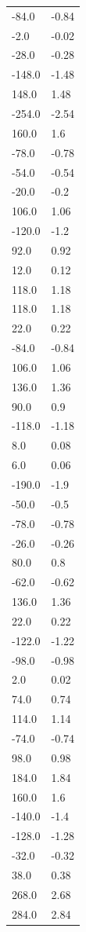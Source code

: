 \begin{longtable}{ll}
-84.0 & -0.84 \\
-2.0 & -0.02 \\
-28.0 & -0.28 \\
-148.0 & -1.48 \\
148.0 & 1.48 \\
-254.0 & -2.54 \\
160.0 & 1.6 \\
-78.0 & -0.78 \\
-54.0 & -0.54 \\
-20.0 & -0.2 \\
106.0 & 1.06 \\
-120.0 & -1.2 \\
92.0 & 0.92 \\
12.0 & 0.12 \\
118.0 & 1.18 \\
118.0 & 1.18 \\
22.0 & 0.22 \\
-84.0 & -0.84 \\
106.0 & 1.06 \\
136.0 & 1.36 \\
90.0 & 0.9 \\
-118.0 & -1.18 \\
8.0 & 0.08 \\
6.0 & 0.06 \\
-190.0 & -1.9 \\
-50.0 & -0.5 \\
-78.0 & -0.78 \\
-26.0 & -0.26 \\
80.0 & 0.8 \\
-62.0 & -0.62 \\
136.0 & 1.36 \\
22.0 & 0.22 \\
-122.0 & -1.22 \\
-98.0 & -0.98 \\
2.0 & 0.02 \\
74.0 & 0.74 \\
114.0 & 1.14 \\
-74.0 & -0.74 \\
98.0 & 0.98 \\
184.0 & 1.84 \\
160.0 & 1.6 \\
-140.0 & -1.4 \\
-128.0 & -1.28 \\
-32.0 & -0.32 \\
38.0 & 0.38 \\
268.0 & 2.68 \\
284.0 & 2.84 \\

\end{longtable}
